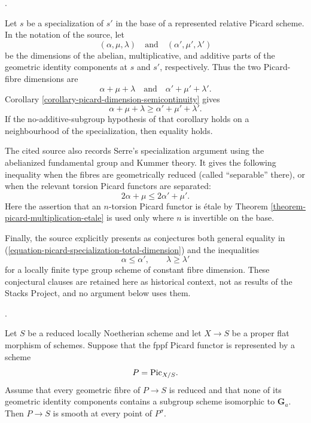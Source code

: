\begin{remark}
\label{remark-picard-specialization-dimensions}
\begin{reference}
\cite[Expos\'e 236, Remark 2.8, pp. 234--235]{FGA}.
\end{reference}
Let $s$ be a specialization of $s'$ in the base of a represented relative
Picard scheme. In the notation of the source, let
$$
(\alpha,\mu,\lambda)
\quad\text{and}\quad
(\alpha',\mu',\lambda')
$$
be the dimensions of the abelian, multiplicative, and additive parts of the
geometric identity components at $s$ and $s'$, respectively. Thus the two
Picard-fibre dimensions are
$$
\alpha+\mu+\lambda
\quad\text{and}\quad
\alpha'+\mu'+\lambda'.
$$
Corollary \ref{corollary-picard-dimension-semicontinuity} gives
\begin{equation}
\label{equation-picard-specialization-total-dimension}
\alpha+\mu+\lambda\geq\alpha'+\mu'+\lambda'.
\end{equation}
If the no-additive-subgroup hypothesis of that corollary holds on a
neighbourhood of the specialization, then equality holds.

The cited source also records Serre's specialization argument using the
abelianized fundamental group and Kummer theory. It gives the following
inequality when the fibres are geometrically reduced (called ``separable''
there), or when the relevant torsion Picard functors are separated:
\begin{equation}
\label{equation-picard-specialization-tate-dimension}
2\alpha+\mu\leq 2\alpha'+\mu'.
\end{equation}
Here the assertion that an $n$-torsion Picard functor is \'etale by Theorem
\ref{theorem-picard-multiplication-etale} is used only where $n$ is invertible
on the base.

Finally, the source explicitly presents as conjectures both general equality
in (\ref{equation-picard-specialization-total-dimension}) and the inequalities
$$
\alpha\leq\alpha',\qquad \lambda\geq\lambda'
$$
for a locally finite type group scheme of constant fibre dimension. These
conjectural clauses are retained here as historical context, not as results
of the Stacks Project, and no argument below uses them.
\end{remark}

\begin{lemma}
\label{lemma-picard-smooth-prime-to-characteristic-reduced-base}
\begin{reference}
\cite[Expos\'e 236, Remark 2.9, p. 235]{FGA}.
\end{reference}
Let $S$ be a reduced locally Noetherian scheme and let $X\to S$ be a proper
flat morphism of schemes. Suppose that the fppf Picard functor is represented
by a scheme
$$
P=\mathrm{Pic}_{X/S}.
$$
Assume that every geometric fibre of $P\to S$ is reduced and that none of
its geometric identity components contains a subgroup scheme isomorphic to
$\mathbf G_a$. Then $P\to S$ is smooth at every point of $P^\sigma$.
\end{lemma}

